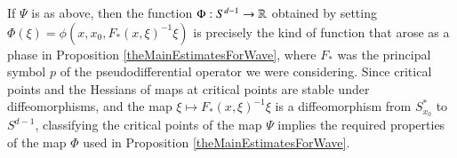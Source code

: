 If $\Psi$ is as above, then the function $\Phi: S^{d-1} \to \operatorname{\mathbb{R}}$ obtained by setting $\Phi(\xi) = \phi( x, x_0, F_*(x,\xi)^{-1} \xi  )$ is precisely the kind of function that arose as a phase in Proposition \ref{theMainEstimatesForWave}, where $F_*$ was the principal symbol $p$ of the pseudodifferential operator we were considering. Since critical points and the Hessians of maps at critical points are stable under diffeomorphisms, %
and the map $\xi \mapsto F_*(x,\xi)^{-1} \xi$ is a diffeomorphism from $S_{x_0}^*$ to $S^{d-1}$, classifying the critical points of the map $\Psi$ implies the required properties of the map $\Phi$ used in Proposition \ref{theMainEstimatesForWave}.




